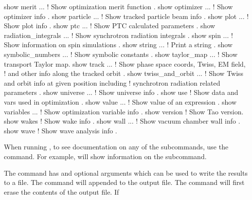 {{{{{{{\begin{example}
  show merit ...               ! Show optimization merit function .
  show optimizer ...           ! Show optimizer info .
  show particle ...            ! Show tracked particle beam info .
  show plot ...                ! Show plot info .
  show ptc ...                 ! Show PTC calculated parameters .
  show radiation_integrals ... ! Show synchrotron radiation integrals .
  show spin ...                ! Show information on spin simulations .
  show string ...              ! Print a string .
  show symbolic_numbers ...    ! Show symbolic constants .
  show taylor_map ...          ! Show transport Taylor map.
  show track ...               ! Show phase space coords, Twiss, EM field, 
                               !   and other info along the tracked orbit .
  show twiss_and_orbit ...     ! Show Twiss and orbit info at given position including
                               !   synchrotron radiation related parameters .
  show universe ...            ! Show universe info .
  show use                     ! Show data and vars used in optimization .
  show value ...               ! Show value of an expression .
  show variables ...           ! Show optimization variable info .
  show version                 ! Show Tao version.
  show wakes                   ! Show wake info .
  show wall ...                ! Show vacuum chamber wall info .
  show wave                    ! Show wave analysis info .
\end{example}

\vskip 10pt 

When running \tao, to see documentation on any of the subcommands, use the  command. For example,  will show information on the  subcommand.

The  command has  and  optional arguments which can be used to write
the results to a file.  The  command will appended to the output file. The  command will first erase the contents of the output file. If \vn{global%
\vn{*} character in it, a three digit number is substituted for the \vn{*}. The value of the number
starts at \vn{001} and increases by 1 each time \vn{show -write} is used.  Example:
\begin{example}
  show -write floor.dat lat -floor  ! Write floor positions to the file "floor.dat".
\end{example}

}}}}}}}}
